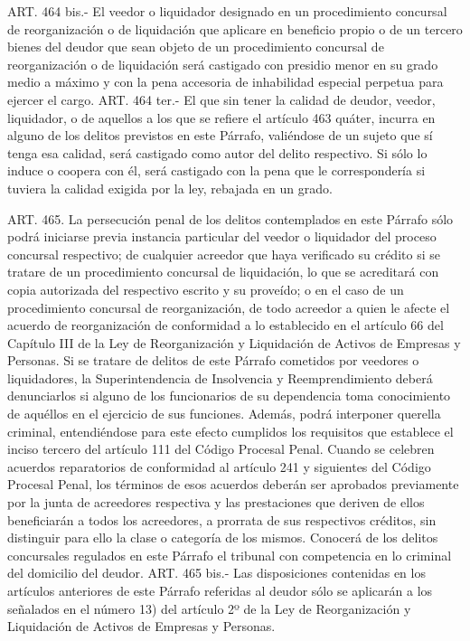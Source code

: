     ART. 464 bis.-
    El veedor o liquidador designado en un procedimiento concursal de reorganización o de liquidación que aplicare en beneficio propio o de un tercero bienes del deudor que sean objeto de un procedimiento concursal de reorganización o de liquidación será castigado con presidio menor en su grado medio a máximo y con la pena accesoria de inhabilidad especial perpetua para ejercer el cargo.
    ART. 464 ter.-
    El que sin tener la calidad de deudor, veedor, liquidador, o de aquellos a los que se refiere el artículo 463 quáter, incurra en alguno de los delitos previstos en este Párrafo, valiéndose de un sujeto que sí tenga esa calidad, será castigado como autor del delito respectivo.
    Si sólo lo induce o coopera con él, será castigado con la pena que le correspondería si tuviera la calidad exigida por la ley, rebajada en un grado.


    ART. 465.
    La persecución penal de los delitos contemplados en este Párrafo sólo podrá iniciarse previa instancia particular del veedor o liquidador del proceso concursal respectivo; de cualquier acreedor que haya verificado su crédito si se tratare de un procedimiento concursal de liquidación, lo que se acreditará con copia autorizada del respectivo escrito y su proveído; o en el caso de un procedimiento concursal de reorganización, de todo acreedor a quien le afecte el acuerdo de reorganización de conformidad a lo establecido en el artículo 66 del Capítulo III de la Ley de Reorganización y Liquidación de Activos de Empresas y Personas.
    Si se tratare de delitos de este Párrafo cometidos por veedores o liquidadores, la Superintendencia de Insolvencia y Reemprendimiento deberá denunciarlos si alguno de los funcionarios de su dependencia toma conocimiento de aquéllos en el ejercicio de sus funciones. Además, podrá interponer querella criminal, entendiéndose para este efecto cumplidos los requisitos que establece el inciso tercero del artículo 111 del Código Procesal Penal.
    Cuando se celebren acuerdos reparatorios de conformidad al artículo 241 y siguientes del Código Procesal Penal, los términos de esos acuerdos deberán ser aprobados previamente por la junta de acreedores respectiva y las prestaciones que deriven de ellos beneficiarán a todos los acreedores, a prorrata de sus respectivos créditos, sin distinguir para ello la clase o categoría de los mismos.
    Conocerá de los delitos concursales regulados en este Párrafo el tribunal con competencia en lo criminal del domicilio del deudor.
    ART. 465 bis.-
    Las disposiciones contenidas en los artículos anteriores de este Párrafo referidas al deudor sólo se aplicarán a los señalados en el número 13) del artículo 2º de la Ley de Reorganización y Liquidación de Activos de Empresas y Personas.

